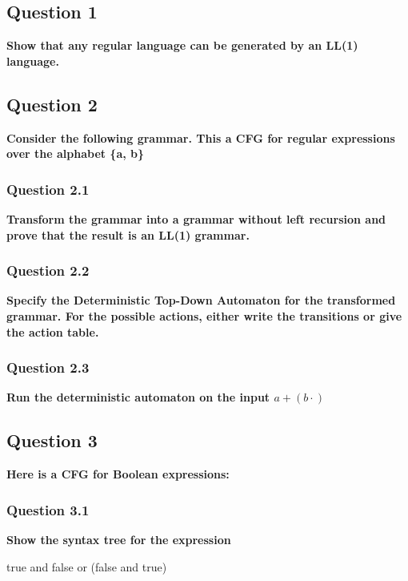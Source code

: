 \subsection{Question 1}
    \textbf{Show that any regular language can be generated by an LL(1) language.} \\
    
    

\subsection{Question 2}
    \textbf{Consider the following grammar. This a CFG for regular expressions over the alphabet \{a, b\}}

    
    \subsubsection{Question 2.1}
        \textbf{Transform the grammar into a grammar without left recursion and prove that the result is an LL(1) grammar.}

        

        

    \subsubsection{Question 2.2}
        \textbf{Specify the Deterministic Top-Down Automaton for the transformed grammar. For the possible actions, either write the transitions or give the action table.}

        

    \subsubsection{Question 2.3}
        \textbf{Run the deterministic automaton on the input $a + (b \cdot)$}

        

\subsection{Question 3}
    \textbf{Here is a CFG for Boolean expressions:}
    

    \subsubsection{Question 3.1}
        \textbf{Show the syntax tree for the expression}
            \begin{center}
                true and false or (false and true)
            \end{center}
    
